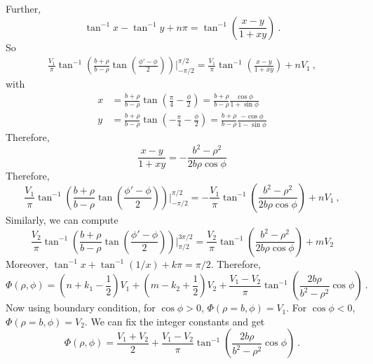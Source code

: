 \documentclass[12pt]{article}
\begin{document}
Further,
\begin{equation}
    \tan^{-1}x - \tan^{-1} y + n \pi = \tan^{-1}\left(\frac{x - y}{1 + xy}\right)~.
\end{equation}
So
\begin{align}
    \frac{V_1}{\pi} \tan^{-1}\left(\frac{b+\rho}{b- \rho} \tan\left(\frac{\phi'-\phi}{2}\right)\right)\Bigg|_{-\pi/2}^{\pi/2} = \frac{V_1}{\pi}\tan^{-1}\left(\frac{x-y}{1+xy}\right)+ n V_1~,
\end{align}
with
\begin{align}
    x &= \frac{b + \rho}{b - \rho} \tan\left(\frac{\pi}{4} - \frac{\phi}{2}\right) = \frac{b + \rho}{b - \rho} \frac{\cos \phi}{1 + \sin \phi}\\
    y &= \frac{b + \rho}{b - \rho} \tan\left(-\frac{\pi}{4} - \frac{\phi}{2}\right)= \frac{b+ \rho}{b - \rho} \frac{-\cos\phi}{1 - \sin\phi}
\end{align}
Therefore,
\begin{equation}
    \frac{x-y}{1+xy} = - \frac{b^2 - \rho^2}{2b \rho \cos \phi}
\end{equation}
Therefore,
\begin{equation}
     \frac{V_1}{\pi} \tan^{-1}\left(\frac{b+\rho}{b- \rho} \tan\left(\frac{\phi'-\phi}{2}\right)\right)\Bigg|_{-\pi/2}^{\pi/2} = -\frac{V_1}{\pi}\tan^{-1}\left(\frac{b^2 - \rho^2}{2b \rho \cos \phi}\right)+ n V_1~,
\end{equation}
Similarly, we can compute
\begin{equation}
    \frac{V_2}{\pi} \tan^{-1}\left(\frac{b+\rho}{b- \rho} \tan\left(\frac{\phi'-\phi}{2}\right)\right)\Bigg|_{\pi/2}^{3\pi/2}=\frac{V_2}{\pi} \tan^{-1} \left(\frac{b^2 - \rho^2}{2b\rho \cos \phi}\right) + m V_2
\end{equation}
Moreover, $\tan^{-1}x + \tan^{-1}(1/x) + k\pi = \pi/2$. Therefore,
\begin{equation}
    \Phi(\rho , \phi) = \left(n + k_1 - \frac12\right) V_1 + \left(m - k_2 + \frac 12\right) V_2 + \frac{V_1 - V_2}{\pi} \tan^{-1}\left(\frac{2b\rho}{b^2 - \rho^2} \cos \phi\right)\nonumber~.
\end{equation}
Now using boundary condition, for $\cos\phi > 0$, $\Phi(\rho = b, \phi) = V_1$. For $\cos \phi < 0$, $\Phi(\rho = b, \phi) = V_2$. We can fix the integer constants and get
\begin{equation}
    \Phi(\rho, \phi) = \frac{V_1 + V_2}{2} + \frac{V_1 - V_2}{\pi} \tan^{-1} \left(\frac{2b\rho}{b^2 - \rho^2} \cos \phi\right)~.
\end{equation}
\end{document}

